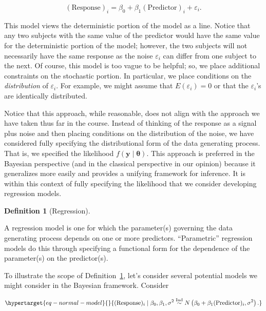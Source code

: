\documentclass[
  letterpaper,
  DIV=11,
  numbers=noendperiod]{scrreprt}
\theoremstyle{definition}
\theoremstyle{definition}
\newtheorem{definition}{Definition}[chapter]
\theoremstyle{plain}
\theoremstyle{remark}
\begin{document}
\[(\text{Response})_i = \beta_0 + \beta_1 (\text{Predictor})_i + \varepsilon_i.\]

This model views the deterministic portion of the model as a line.
Notice that any two subjects with the same value of the predictor would
have the same value for the deterministic portion of the model; however,
the two subjects will not necessarily have the same response as the
noise \(\varepsilon_i\) can differ from one subject to the next. Of
course, this model is too vague to be helpful; so, we place additional
constraints on the stochastic portion. In particular, we place
conditions on the \emph{distribution} of \(\varepsilon_i\). For example,
we might assume that \(E\left(\varepsilon_i\right) = 0\) or that the
\(\varepsilon_i\)'s are identically distributed.

Notice that this approach, while reasonable, does not align with the
approach we have taken thus far in the course. Instead of thinking of
the response as a signal plus noise and then placing conditions on the
distribution of the noise, we have considered fully specifying the
distributional form of the data generating process. That is, we
specified the likelihood \(f(\mathbf{y} \mid \boldsymbol{\theta})\).
This approach is preferred in the Bayesian perspective (and in the
classical perspective in our opinion) because it generalizes more easily
and provides a unifying framework for inference. It is within this
context of fully specifying the likelihood that we consider developing
regression models.

\begin{definition}[Regression]\protect\hypertarget{def-regression}{}\label{def-regression}

A regression model is one for which the parameter(s) governing the data
generating process depends on one or more predictors. ``Parametric''
regression models do this through specifying a functional form for the
dependence of the parameter(s) on the predictor(s).

\end{definition}

To illustrate the scope of Definition~\ref{def-regression}, let's
consider several potential models we might consider in the Bayesian
framework. Consider

\begin{equation}\protect\hypertarget{eq-normal-model}{}{(\text{Response})_i \mid \beta_0, \beta_1, \sigma^2 \stackrel{\text{Ind}}{\sim}N\left(\beta_0 + \beta_1 (\text{Predictor})_i, \sigma^2\right).}\label{eq-normal-model}\end{equation}
\end{document}
